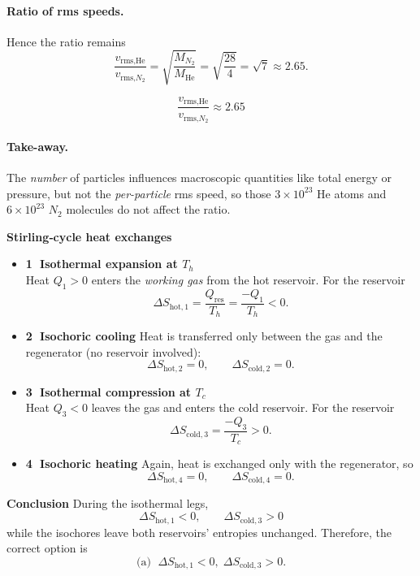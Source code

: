 \documentclass[12pt]{article}
\theoremstyle{definition} %
\theoremstyle{plain} %
\begin{document}
\paragraph{Ratio of rms speeds.}
Hence the ratio remains
\[
\frac{v_{\text{rms,He}}}{v_{\text{rms,}N_2}}
   = \sqrt{\frac{M_{N_2}}{M_{\text{He}}}}
   = \sqrt{\frac{28}{4}}
   = \sqrt{7}
   \approx 2.65.
\]

\[
\boxed{\displaystyle
  \frac{v_{\text{rms,He}}}{v_{\text{rms,}N_2}}\approx 2.65
}
\]

\paragraph{Take-away.}
The \emph{number} of particles influences macroscopic quantities
like total energy or pressure, but not the
\emph{per-particle} rms speed, so those \(3\times10^{23}\) He atoms
and \(6\times10^{23}\) \(N_2\) molecules do not affect the ratio.


\textbf{Stirling‐cycle heat exchanges}  
\begin{itemize}
  \item \textbf{1 $\;$Isothermal expansion at $T_h$}\\[-4pt]
        Heat $Q_1>0$ enters the \emph{working gas} from the hot reservoir.  
        For the reservoir  
        \[
            \Delta S_{\text{hot},1}
              = \frac{Q_{\text{res}}}{T_h}
              = \frac{-Q_1}{T_h}<0.
        \]
  \item \textbf{2 $\;$Isochoric cooling}  
        Heat is transferred only between the gas and the regenerator 
        (no reservoir involved):  
        \[
            \Delta S_{\text{hot},2}=0, \qquad
            \Delta S_{\text{cold},2}=0.
        \]
  \item \textbf{3 $\;$Isothermal compression at $T_c$}\\[-4pt]
        Heat $Q_3<0$ leaves the gas and enters the cold reservoir.  
        For the reservoir  
        \[
            \Delta S_{\text{cold},3}
              = \frac{-Q_3}{T_c}>0.
        \]
  \item \textbf{4 $\;$Isochoric heating}  
        Again, heat is exchanged only with the regenerator, so  
        \[
            \Delta S_{\text{hot},4}=0, \qquad
            \Delta S_{\text{cold},4}=0.
        \]
\end{itemize}

\textbf{Conclusion}  
During the isothermal legs,
\[
    \boxed{\;
        \Delta S_{\text{hot},1}<0, \qquad 
        \Delta S_{\text{cold},3}>0
    \;}
\]
while the isochores leave both reservoirs’ entropies unchanged.
Therefore, the correct option is  
\[
\text{(a) }\; \Delta S_{\text{hot},1}<0,\; \Delta S_{\text{cold},3}>0.
\]
\end{document}
